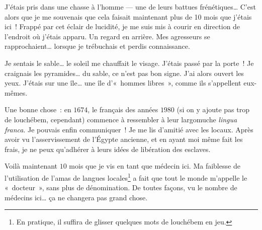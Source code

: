 {		J’étais pris dans une chasse à l’homme — une de leurs battues frénétiques…
		C’est alors que je me souvenais que cela faisait maintenant plus de 10 mois que j’étais ici~!
		Frappé par cet éclair de lucidité, je me suis mis à courir en direction de l’endroit où j’étais apparu.
		Un regard en arrière.  Mes agresseurs se rapprochaient… lorsque je trébuchais et perdis connaissance.

		Je sentais le sable… le soleil me chauffait le visage.
		J’étais passé par la porte~!
		Je craignais les pyramides… du sable, ce n’est pas bon signe.
		J’ai alors ouvert les yeux.
		J’étais sur une île… une île d’«~hommes libres~», comme ils s’appellent eux-mêmes.

		Une bonne chose~:  en $1674$, le français des années $1980$ (si on y ajoute pas trop de louchébem, cependant) commence à ressembler à leur largomuche \emph{lingua franca}.  Je pouvais enfin communiquer~!
		Je me lis d’amitié avec les locaux.
		Après avoir vu l’asservissement de l’Égypte ancienne, et en ayant moi même fait les frais, je ne peux qu’adhérer à leurs idées de libération des esclaves.

		Voilà maintenant $10$ mois que je vis en tant que médecin ici.
		Ma faiblesse de l’utilisation de l’amas de langues locales\footnote{En pratique, il suffira de glisser quelques mots de louchébem en jeu.} a fait que tout le monde m’appelle le «~docteur~», sans plus de dénomination.
		De toutes façons, vu le nombre de médecins ici… ça ne changera pas grand chose.
}



